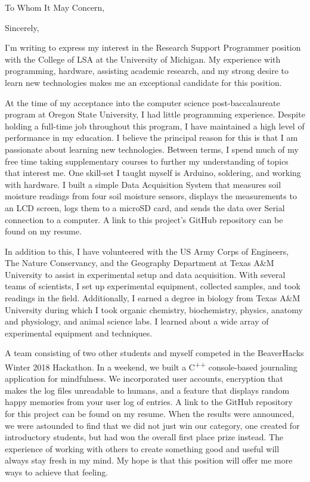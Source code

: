 \documentclass[11pt,a4paper,roman]{moderncv}        %
\begin{document}
\date{September 7, 2019}
\opening{To Whom It May Concern,}
\closing{Sincerely,}
\makelettertitle

I'm writing to express my interest in the Research Support Programmer position with the College of LSA at the University of Michigan. My experience with programming, hardware, assisting academic research, and my strong desire to learn new technologies makes me an exceptional candidate for this position.

At the time of my acceptance into the computer science post-baccalaureate program at Oregon State University, I had little programming experience. Despite holding a full-time job throughout this program, I have maintained a high level of performance in my education. I believe the principal reason for this is that I am passionate about learning new technologies. Between terms, I spend much of my free time taking supplementary courses to further my understanding of topics that interest me. One skill-set I taught myself is Arduino, soldering, and working with hardware. I built a simple Data Acquisition System that measures soil moisture readings from four soil moisture sensors, displays the measurements to an LCD screen, logs them to a microSD card, and sends the data over Serial connection to a computer. A link to this project's GitHub repository can be found on my resume.

In addition to this, I have volunteered with the US Army Corps of Engineers, The Nature Conservancy, and the Geography Department at Texas A\&M University to assist in experimental setup and data acquisition. With several teams of scientists, I set up experimental equipment, collected samples, and took readings in the field. Additionally, I earned a degree in biology from Texas A\&M University during which I took organic chemistry, biochemistry, physics, anatomy and physiology, and animal science labs. I learned about a wide array of experimental equipment and techniques.

A team consisting of two other students and myself competed in the BeaverHacks Winter 2018 Hackathon. In a weekend, we built a C\textsuperscript{++} console-based journaling application for mindfulness. We incorporated user accounts, encryption that makes the log files unreadable to humans, and a feature that displays random happy memories from your user log of entries. A link to the  GitHub repository for this project can be found on my resume. When the results were announced, we were astounded to find that we did not just win our category, one created for introductory students, but had won the overall first place prize instead. The experience of working with others to create something good and useful will always stay fresh in my mind. My hope is that this position will offer me more ways to achieve that feeling.
\end{document}
